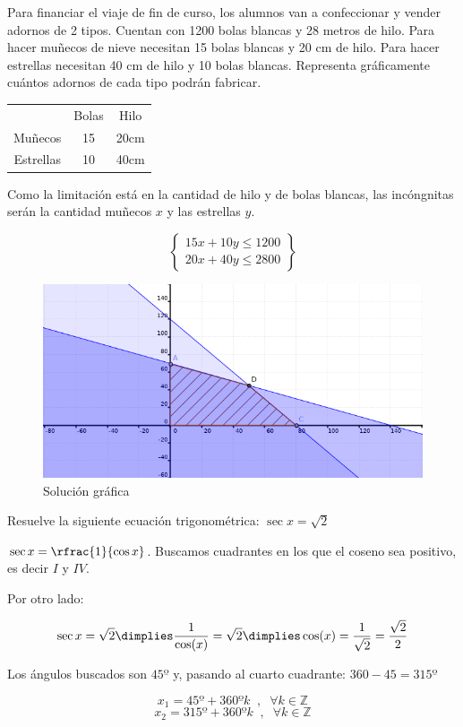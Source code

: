 \documentclass[palatino,nosec]{Docencia}
\begin{document}
\begin{problem}
Para financiar el viaje de fin de curso, los alumnos van a confeccionar y vender
adornos de 2 tipos. Cuentan con 1200 bolas blancas y 28 metros de hilo. Para hacer muñecos
de nieve necesitan 15 bolas blancas y 20 cm de hilo. Para hacer estrellas necesitan 40 cm de
hilo y 10 bolas blancas. Representa gráficamente cuántos adornos de cada tipo podrán
fabricar.
\solution

\begin{table}[hbtp]
\centering
\begin{tabular}{ccc}
&Bolas & Hilo\\
Muñecos & 15 & 20cm\\
Estrellas & 10 & 40cm
\end{tabular}
\end{table}

Como la limitación está en la cantidad de hilo y de bolas blancas, las incóngnitas serán la cantidad muñecos $x$ y las estrellas $y$.

\[
\left\{
	\begin{array}{c}
		15x + 10y ≤ 1200\\
		20x + 40y ≤ 2800
	\end{array}
\right\}
\]

\begin{figure}[h]
\centering
\includegraphics[scale=0.7]{Problema}
\caption{Solución gráfica}
\label{prob5}
\end{figure}

\end{problem}

\begin{problem}

Resuelve la siguiente ecuación trigonométrica: $\sec x = \sqrt{2}$

\solution

$\sec x = \rfrac{1}{\cos x}$. Buscamos cuadrantes en los que el coseno sea positivo, es decir $I$ y $IV$.

Por otro lado:

\[
	\sec x = \sqrt{2} \dimplies \frac{1}{\cos(x)} = \sqrt{2} \dimplies \cos(x) = \frac{1}{\sqrt{2}} = \frac{\sqrt{2}}{2} 
\]

Los ángulos buscados son $45º$ y, pasando al cuarto cuadrante: $360-45 = 315º$

\[
	x_1 = 45º + 360ºk\;\;,\;\; ∀k∈ℤ
\]
\[
	x_2 = 315º + 360ºk\;\;,\;\; ∀k∈ℤ
\]

\end{problem}
\end{document}
